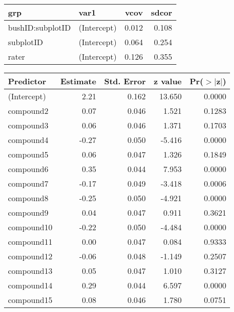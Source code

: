 \begin{table}[ht]
\centering
\begin{tabular}{llrr}
  \hline
grp & var1 & vcov & sdcor \\ 
  \hline
bushID:subplotID & (Intercept) & 0.012 & 0.108 \\ 
  subplotID & (Intercept) & 0.064 & 0.254 \\ 
  rater & (Intercept) & 0.126 & 0.355 \\ 
   \hline
\end{tabular}
\begin{tabular}{lrrrr}
  \hline
Predictor & Estimate & Std. Error & z value & Pr($>$$|$z$|$) \\ 
  \hline
(Intercept) & 2.21 & 0.162 & 13.650 & 0.0000 \\ 
  compound2 & 0.07 & 0.046 & 1.521 & 0.1283 \\ 
  compound3 & 0.06 & 0.046 & 1.371 & 0.1703 \\ 
  compound4 & -0.27 & 0.050 & -5.416 & 0.0000 \\ 
  compound5 & 0.06 & 0.047 & 1.326 & 0.1849 \\ 
  compound6 & 0.35 & 0.044 & 7.953 & 0.0000 \\ 
  compound7 & -0.17 & 0.049 & -3.418 & 0.0006 \\ 
  compound8 & -0.25 & 0.050 & -4.921 & 0.0000 \\ 
  compound9 & 0.04 & 0.047 & 0.911 & 0.3621 \\ 
  compound10 & -0.22 & 0.050 & -4.484 & 0.0000 \\ 
  compound11 & 0.00 & 0.047 & 0.084 & 0.9333 \\ 
  compound12 & -0.06 & 0.048 & -1.149 & 0.2507 \\ 
  compound13 & 0.05 & 0.047 & 1.010 & 0.3127 \\ 
  compound14 & 0.29 & 0.044 & 6.597 & 0.0000 \\ 
  compound15 & 0.08 & 0.046 & 1.780 & 0.0751 \\ 
   \hline
\end{tabular}
\end{table}
